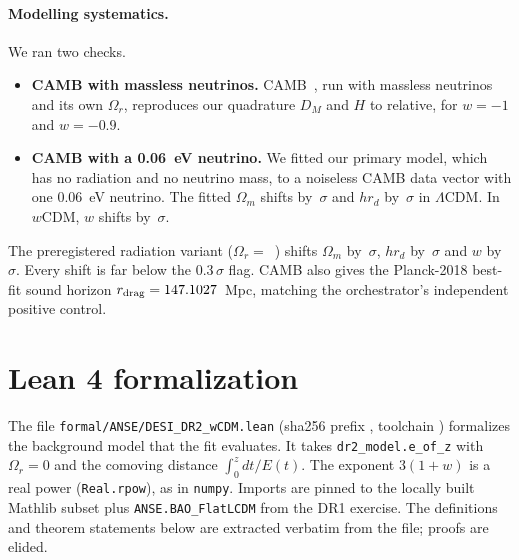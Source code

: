 \documentclass[11pt]{article}
\begin{document}
\paragraph{Modelling systematics.} We ran two checks.
\begin{itemize}
\item \textbf{CAMB with massless neutrinos.} CAMB~\CambVersion{}, run with
massless neutrinos and its own $\Omega_r$, reproduces our quadrature $D_M$
and $H$ to \CambMassless{} relative, for $w=-1$ and $w=-0.9$.
\item \textbf{CAMB with a 0.06~eV neutrino.} We fitted our primary model,
which has no radiation and no neutrino mass, to a noiseless CAMB data vector
with one 0.06~eV neutrino. The fitted $\Omega_m$ shifts by \CambOm\,$\sigma$
and $hr_d$ by \CambHrd\,$\sigma$ in $\Lambda$CDM. In $w$CDM, $w$ shifts by
\CambW\,$\sigma$.
\end{itemize}
The preregistered radiation variant ($\Omega_r=$~\Orad) shifts $\Omega_m$ by
\RadOm\,$\sigma$, $hr_d$ by \RadHrd\,$\sigma$ and $w$ by \RadW\,$\sigma$.
Every shift is far below the $0.3\,\sigma$ flag. CAMB also gives the
Planck-2018 best-fit sound horizon $r_{\rm drag}=147.1027$~Mpc, matching the
orchestrator's independent positive control.

\section{Lean 4 formalization}\label{sec:lean}

The file \texttt{formal/ANSE/DESI\_DR2\_wCDM.lean} (sha256 prefix
\texttt{\LeanSha}, toolchain \texttt{\LeanToolchain}) formalizes the
background model that the fit evaluates. It takes
\texttt{dr2\_model.e\_of\_z} with $\Omega_r=0$ and the comoving distance
$\int_0^z dt/E(t)$. The exponent $3(1+w)$ is a real power
(\texttt{Real.rpow}), as in \texttt{numpy}. Imports are pinned to the
locally built Mathlib subset plus \texttt{ANSE.BAO\_FlatLCDM} from the DR1
exercise. The definitions and theorem statements below are extracted
verbatim from the file; proofs are elided.


\end{document}
